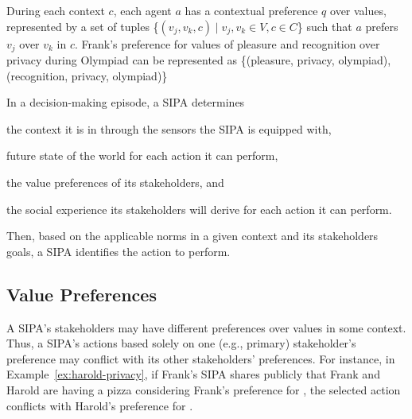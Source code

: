 During each context $c$, each agent $a$ has a contextual preference $q$ over values,
represented by a set of tuples \{$(v_j, v_k, c) \mid v_j, v_k \in V, c
\in C$\} such that $a$ prefers $v_j$ over $v_k$ in $c$. Frank's preference for values of pleasure and recognition over privacy during 
Olympiad can be represented as \{(pleasure, privacy, olympiad), (recognition, privacy, olympiad)\}



In a decision-making episode, a SIPA determines
\begin{enuminline}[label=(\arabic*)]
\item the context it is in through the sensors the SIPA is equipped with,
\item future state of the world for each action it can perform,
\item the value preferences of its stakeholders, and
\item the social experience its stakeholders will derive for each action it can perform.
\end{enuminline}
Then, based on the applicable norms in a given context and its
stakeholders goals, a SIPA identifies the action to perform.


\subsection{Value Preferences}

A SIPA's stakeholders may have different preferences over
values in some context. Thus, a SIPA's actions based solely on one (e.g., primary)
stakeholder's preference may conflict with its other stakeholders'
preferences. For instance, in Example~\ref{ex:harold-privacy}, if
Frank's SIPA shares publicly that Frank and Harold are having a pizza
considering Frank's preference for , the selected action 
conflicts with Harold's preference for .

